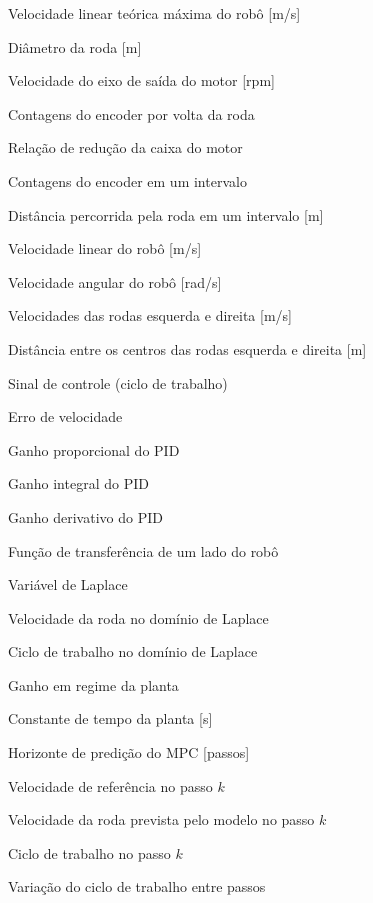 \begin{simbolos}
  \item[$ v_{max} $] Velocidade linear teórica máxima do robô [m/s]
  \item[$ D $] Diâmetro da roda [m]
  \item[$ n $] Velocidade do eixo de saída do motor [rpm]
  \item[$ N_{CPR} $] Contagens do encoder por volta da roda
  \item[$ R $] Relação de redução da caixa do motor
  \item[$ \Delta N $] Contagens do encoder em um intervalo
  \item[$ \Delta s $] Distância percorrida pela roda em um intervalo [m]
  \item[$ v $] Velocidade linear do robô [m/s]
  \item[$ \omega $] Velocidade angular do robô [rad/s]
  \item[$ v_e,\ v_d $] Velocidades das rodas esquerda e direita [m/s]
  \item[$ L $] Distância entre os centros das rodas esquerda e direita [m]
  \item[$ u(t) $] Sinal de controle (ciclo de trabalho)
  \item[$ e(t) $] Erro de velocidade
  \item[$ K_p $] Ganho proporcional do PID
  \item[$ K_i $] Ganho integral do PID
  \item[$ K_d $] Ganho derivativo do PID
  \item[$ G(s) $] Função de transferência de um lado do robô
  \item[$ s $] Variável de Laplace
  \item[$ \Omega(s) $] Velocidade da roda no domínio de Laplace
  \item[$ U(s) $] Ciclo de trabalho no domínio de Laplace
  \item[$ K $] Ganho em regime da planta
  \item[$ \tau $] Constante de tempo da planta [s]
  \item[$ N $] Horizonte de predição do MPC [passos]
  \item[$ r_k $] Velocidade de referência no passo $k$
  \item[$ y_k $] Velocidade da roda prevista pelo modelo no passo $k$
  \item[$ u_k $] Ciclo de trabalho no passo $k$
  \item[$ \Delta u_k $] Variação do ciclo de trabalho entre passos

\end{simbolos}

